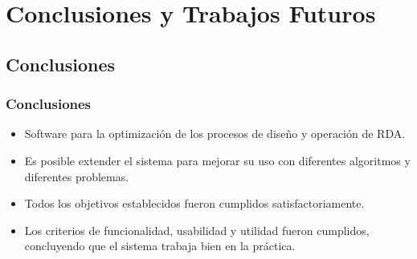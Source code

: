 \documentclass[9pt]{beamer}
\begin{document}
        

    \section{Conclusiones y Trabajos Futuros}
    \subsection{Conclusiones}
    \begin{frame}
        \frametitle{Conclusiones}                       
        
        \begin{itemize}\justifying
            \item Software para la optimización de los procesos de diseño y operación  de RDA.
            \item Es posible extender el sistema para mejorar su uso con diferentes algoritmos y diferentes problemas.
            \item Todos los objetivos establecidos fueron cumplidos satisfactoriamente.
            \item Los criterios de funcionalidad, usabilidad y utilidad fueron cumplidos, concluyendo que el sistema trabaja bien en la práctica. 
        \end{itemize}
    
    \end{frame}
\end{document}
